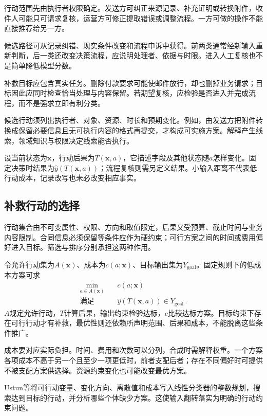 行动范围先由执行者权限确定。发送方可纠正来源记录、补充证明或转换附件，收件人可能只可请求复核，运营方可修正提取错误或调整流程。一方可做的操作不能直接推荐给另一方。

候选路径可从记录纠错、现实条件改变和流程申诉中获得。前两类通常经新输入重新判断，后一类还改变决策流程，应说明处理者、依据与时限。进入人工复核也不是简单降低模型分数。

补救目标应包含真实任务。删除付款要求可能使邮件放行，却也删掉业务请求；目标因此应同时检查恰当处理与内容保留。若期望复核，应检验是否进入并完成流程，而不是强求立即有利分类。

候选行动须列出执行者、对象、资源、时长和预期变化。例如，由发送方把附件转换成保留必要信息且无可执行内容的格式再提交，才构成可实施方案。解释产生线索，领域知识与权限决定线索能否执行。

设当前状态为$\bm x$，行动后果为$T(\bm x,a)$，它描述字段及其他状态随$a$怎样变化。固定决策时结果为$\hat y(T(\bm x,a))$；流程复核则需另定义结果。小输入距离不代表低行动成本，记录改写也未必改变相应事实。

\subsection{补救行动的选择}
\label{sec:interpretability-recourse-action}

行动集合由不可变属性、权限、方向和取值限定，后果又受预算、截止时间与业务内容限制。合同信息必须保留等条件应作为硬约束；可行方案之间的时间或费用偏好进入目标。筛选与排序分别承担这两种作用。

令允许行动集为$A(\bm x)$、成本为$c(a;\bm x)$、目标输出集为$Y_{\mathrm{goal}}$。固定规则下的低成本方案可求
\begin{equation}
 \begin{aligned}
 \min_{a\in A(\bm{x})}\quad &c(a;\bm{x})\\
 \text{满足}\quad &\hat y(T(\bm{x},a))\in Y_{\mathrm{goal}}\, .
 \end{aligned}
 \label{eq:interpretability-recourse}
\end{equation}
$A$规定允许行动，$T$计算后果，输出约束检验达标，$c$比较达标方案。目标约束下存在可行行动才有补救，最优性则还依赖所声明范围、后果和成本，不能脱离这些条件推广。

成本要对应实际负担。时间、费用和次数可以分列，合成时需解释权重。一个方案各项成本不高于另一个且至少一项更低时，前者支配后者；存在不同偏好时可提供不被支配方案供选择。资源约束变化也可能改变最优方案。

Ustun等将可行动变量、变化方向、离散值和成本写入线性分类器的整数规划，搜索达到目标的行动，并分析哪些个体缺少方案。这使输入翻转落实为明确的行动约束问题。

